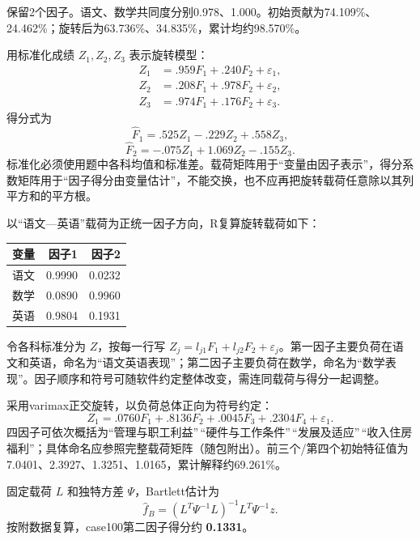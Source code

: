 
保留2个因子。语文、数学共同度分别0.978、1.000。初始贡献为74.109\%、24.462\%；旋转后为63.736\%、34.835\%，累计均约98.570\%。

用标准化成绩 \(Z_1,Z_2,Z_3\) 表示旋转模型： \[\begin{aligned}Z_1&=.959F_1+.240F_2+\varepsilon_1,\\Z_2&=.208F_1+.978F_2+\varepsilon_2,\\Z_3&=.974F_1+.176F_2+\varepsilon_3.\end{aligned}\] 得分式为 \[\widehat F_1=.525Z_1-.229Z_2+.558Z_3,\] \[\widehat F_2=-.075Z_1+1.069Z_2-.155Z_3.\] 标准化必须使用题中各科均值和标准差。载荷矩阵用于``变量由因子表示''，得分系数矩阵用于``因子得分由变量估计''，不能交换，也不应再把旋转载荷任意除以其列平方和的平方根。



以``语文---英语''载荷为正统一因子方向，R复算旋转载荷如下：

\begin{center}\small\setlength{\tabcolsep}{4pt}\renewcommand{\arraystretch}{1.18}\begin{tabular}{@{}lrr@{}}
\toprule
变量 & 因子1 & 因子2 \\
\midrule

语文 & 0.9990 & 0.0232 \\
数学 & 0.0890 & 0.9960 \\
英语 & 0.9804 & 0.1931 \\
\bottomrule\end{tabular}\end{center}

令各科标准分为 \(Z\)，按每一行写 \(Z_j=l_{j1}F_1+l_{j2}F_2+\varepsilon_j\)。第一因子主要负荷在语文和英语，命名为``语文英语表现''；第二因子主要负荷在数学，命名为``数学表现''。因子顺序和符号可随软件约定整体改变，需连同载荷与得分一起调整。



采用varimax正交旋转，以负荷总体正向为符号约定： \[Z_1=.0760F_1+.8136F_2+.0045F_3+.2304F_4+\varepsilon_1.\] 四因子可依次概括为``管理与职工利益''\,``硬件与工作条件''\,``发展及适应''\,``收入住房福利''；具体命名应参照完整载荷矩阵（随包附出）。前三个/第四个初始特征值为7.0401、2.3927、1.3251、1.0165，累计解释约69.261\%。

固定载荷 \(L\) 和独特方差 \(\Psi\)，Bartlett估计为 \[\widehat f_B=(L^T\Psi^{-1}L)^{-1}L^T\Psi^{-1}z.\] 按附数据复算，case100第二因子得分约 \textbf{0.1331}。

